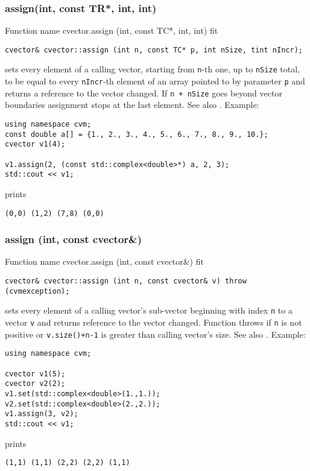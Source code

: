 \subsubsection{assign(int, const TR*, int, int)}
Function%
\pdfdest name {cvector.assign (int, const TC*, int, int)} fit
\begin{verbatim}
cvector& cvector::assign (int n, const TC* p, int nSize, tint nIncr);
\end{verbatim}
sets every element of a calling vector, starting from \Based \verb"n"-th one,
up to \verb"nSize" total,
to be equal to
every \verb"nIncr"-th element of an array  pointed to by parameter \verb"p"
and returns a reference to the vector changed.
If \verb"n + nSize" goes beyond vector boundaries assignment stops at the last element.
See also .
Example:
\begin{Verbatim}
using namespace cvm;
const double a[] = {1., 2., 3., 4., 5., 6., 7., 8., 9., 10.};
cvector v1(4);

v1.assign(2, (const std::complex<double>*) a, 2, 3);
std::cout << v1;
\end{Verbatim}
prints
\begin{Verbatim}
(0,0) (1,2) (7,8) (0,0)
\end{Verbatim}
\newpage



\subsubsection{assign (int, const cvector\&)}
Function%
\pdfdest name {cvector.assign (int, const cvector&)} fit
\begin{verbatim}
cvector& cvector::assign (int n, const cvector& v) throw (cvmexception);
\end{verbatim}
sets every element of a calling vector's sub-vector beginning with
\Based index \verb"n" to a vector \verb"v" and returns 
reference to the vector changed. Function throws 
 if \verb"n" is not
positive or \verb"v.size()+n-1" is greater than  calling vector's
size. See also . Example:
\begin{Verbatim}
using namespace cvm;

cvector v1(5);
cvector v2(2);
v1.set(std::complex<double>(1.,1.));
v2.set(std::complex<double>(2.,2.));
v1.assign(3, v2);
std::cout << v1;
\end{Verbatim}
prints
\begin{Verbatim}
(1,1) (1,1) (2,2) (2,2) (1,1)
\end{Verbatim}
\newpage



